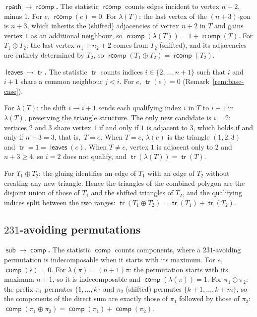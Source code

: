 \documentclass[a4paper,11pt]{article}
\theoremstyle{definition}
\DeclareMathOperator{\comp}{\mathsf{comp}}
\DeclareMathOperator{\rcomp}{\mathsf{rcomp}}
\DeclareMathOperator{\rpath}{\mathsf{rpath}}
\DeclareMathOperator{\leaves}{\mathsf{leaves}}
\DeclareMathOperator{\tr}{\mathsf{tr}}
\DeclareMathOperator{\subtrees}{\mathsf{sub}}
\begin{document}
\textbf{$\boldsymbol{\rpath \to \rcomp}$.}
The statistic $\rcomp$ counts edges incident to vertex
$n{+}2$, minus $1$. For $e$, $\rcomp(e) = 0$. For
$\lambda(T)$: the last vertex of the $(n{+}3)$-gon is
$n{+}3$, which inherits the (shifted) adjacencies of
vertex $n{+}2$ in $T$ and gains vertex $1$ as an
additional neighbour, so
$\rcomp(\lambda(T)) = 1 + \rcomp(T)$.
For $T_1 \oplus T_2$: the last vertex $n_1{+}n_2{+}2$
comes from $T_2$ (shifted), and its adjacencies are
entirely determined by $T_2$, so
$\rcomp(T_1 \oplus T_2) = \rcomp(T_2)$.

\textbf{$\boldsymbol{\leaves \to \tr}$.}
The statistic $\tr$ counts indices
$i \in \{2, \ldots, n{+}1\}$ such that $i$ and $i{+}1$
share a common neighbour $j < i$. For $e$,
$\tr(e) = 0$ (Remark~\ref{rem:base-case}).

For $\lambda(T)$: the shift $i \to i{+}1$ sends each
qualifying index $i$ in $T$ to $i{+}1$ in $\lambda(T)$,
preserving the triangle structure. The only new candidate
is $i = 2$: vertices $2$ and $3$ share vertex $1$ if and
only if $1$ is adjacent to $3$, which holds if and only
if $n{+}3 = 3$, that is,\
$T = e$. When $T = e$, $\lambda(e)$ is the triangle
$(1,2,3)$ and $\tr = 1 = \leaves(e)$. When $T \neq e$,
vertex $1$ is adjacent only to $2$ and $n{+}3 \geq 4$,
so $i = 2$ does not qualify, and
$\tr(\lambda(T)) = \tr(T)$.

For $T_1 \oplus T_2$: the gluing identifies an edge
of $T_1$ with an edge of $T_2$ without creating any
new triangle. Hence the triangles of the combined polygon
are the disjoint union of those of $T_1$ and the
shifted triangles of $T_2$, and the qualifying indices
split between the two ranges:
$\tr(T_1 \oplus T_2) = \tr(T_1) + \tr(T_2)$.

\subsection{$231$-avoiding permutations}\label{sec:dict-231}

\textbf{$\boldsymbol{\subtrees \to \comp}$.}
The statistic $\comp$ counts components,
where a $231$-avoiding permutation is indecomposable when it
starts with its maximum. For $e$,
$\comp(\epsilon) = 0$. For
$\lambda(\pi) = (n{+}1) \pi$: the permutation
starts with its maximum $n{+}1$, so it is indecomposable
and $\comp(\lambda(\pi)) = 1$. For
$\pi_1 \oplus \pi_2$: the prefix $\pi_1$ permutes
$\{1, \ldots, k\}$ and $\pi_2$ (shifted) permutes
$\{k{+}1, \ldots, k{+}m\}$, so the components of the
direct sum are exactly those of $\pi_1$ followed by
those of $\pi_2$:
$\comp(\pi_1 \oplus \pi_2)
= \comp(\pi_1) + \comp(\pi_2)$.
\end{document}
